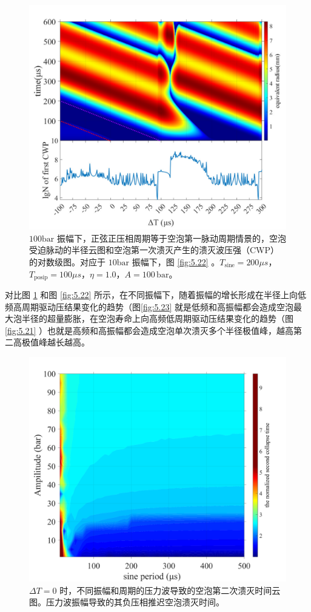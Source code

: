 \begin{figure}[H]
  \centering
  \includegraphics[width=0.9\linewidth]{img/fig5.27-eps-converted-to.pdf}
  \caption[$100\mathrm{bar}$时的正压相与周期相等情况的溃灭波压力对数图]{$100\mathrm{bar}$
振幅下，正弦正压相周期等于空泡第一脉动周期情景的，空泡受迫脉动的半径云图和空泡第一次溃灭产生的溃灭波压强（CWP）的对数级图。对应于
$10\mathrm{bar}$ 振幅下，图 \ref{fig:5.22} 
。$T_\mathrm{sine}=200 \mu s$，$T_\mathrm{posip}=100\mu s$，$\eta =1.0$，$A=100\, \mathrm {bar}$。}
  \label{fig:5.27}
\end{figure}

对比图 \ref{fig:5.27} 和图 \ref{fig:5.22} 
所示，在不同振幅下，随着振幅的增长形成在半径上向低频高周期驱动压结果变化的趋势（图\ref{fig:5.23} 
就是低频和高振幅都会造成空泡最大泡半径的超量膨胀，在空泡寿命上向高频低周期驱动压结果变化的趋势（图
\ref{fig:5.21} ）也就是高频和高振幅都会造成空泡单次溃灭多个半径极值峰，越高第二高极值峰越长越高。

\begin{figure}[H]
  \centering
  \includegraphics[width=0.7\linewidth]{img/fig5.28.pdf}
  \caption[$\Delta T=0$
时，不同振幅和周期的压力波导致的空泡第二次溃灭时间云图]{$\Delta T=0$
时，不同振幅和周期的压力波导致的空泡第二次溃灭时间云图。压力波振幅导致的其负压相推迟空泡溃灭时间。}
  \label{fig:5.28}
\end{figure}

